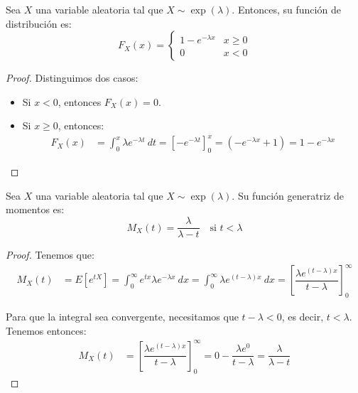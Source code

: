 \begin{prop}
    Sea $X$ una variable aleatoria tal que $X\sim \exp(\lambda)$. Entonces, su función de distribución es:
    \begin{equation*}
        F_X(x) = \begin{cases}
            1-e^{-\lambda x} & x\geq 0\\
            0 & x<0
        \end{cases}
    \end{equation*}
\end{prop}
\begin{proof}
    Distinguimos dos casos:
    \begin{itemize}
        \item Si $x<0$, entonces $F_X(x) = 0$.
        \item Si $x\geq 0$, entonces:
        \begin{align*}
            F_X(x)
            &= \int_{0}^{x} \lambda e^{-\lambda t}~dt
            = \left[ -e^{-\lambda t} \right]_{0}^{x}
            = \left( -e^{-\lambda x} + 1 \right) = 1-e^{-\lambda x}
        \end{align*}
    \end{itemize}
\end{proof}


\begin{prop}
    Sea $X$ una variable aleatoria tal que $X\sim \exp(\lambda)$. Su función generatriz de momentos es:
    \begin{equation*}
        M_X(t) = \dfrac{\lambda}{\lambda-t} \quad \text{si } t<\lambda
    \end{equation*}
\end{prop}
\begin{proof}
    Tenemos que:
    \begin{align*}
        M_X(t) &= E\left[e^{tX}\right] = \int_{0}^{\infty} e^{tx} \lambda e^{-\lambda x}~dx
        = \int_{0}^{\infty} \lambda e^{(t-\lambda)x}~dx
        = \left[ \dfrac{\lambda e^{(t-\lambda)x}}{t-\lambda} \right]_{0}^{\infty}
    \end{align*}

    Para que la integral sea convergente, necesitamos que $t-\lambda<0$, es decir, $t<\lambda$. Tenemos entonces:
    \begin{align*}
        M_X(t) &= \left[ \dfrac{\lambda e^{(t-\lambda)x}}{t-\lambda} \right]_{0}^{\infty}
        = 0 - \dfrac{\lambda e^{0}}{t-\lambda} = \dfrac{\lambda}{\lambda-t}
    \end{align*}
\end{proof}

